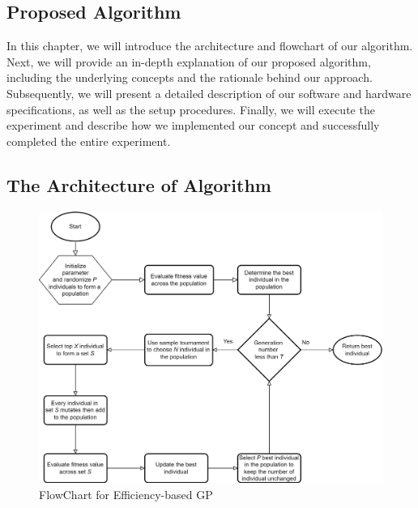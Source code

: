 \begin{ZhChapter}

\chapter{Proposed Algorithm}
In this chapter, we will introduce the architecture and flowchart of our algorithm. Next, we will provide an in-depth explanation of our proposed algorithm, including the underlying concepts and the rationale behind our approach. Subsequently, we will present a detailed description of our software and hardware specifications, as well as the setup procedures. Finally, we will execute the experiment and describe how we implemented our concept and successfully completed the entire experiment.
\section{The Architecture of Algorithm} %
\begin{figure}[htbp]
    \centering
    \includegraphics[width = 1\textwidth]{image/FlowChart.png}
    \caption{FlowChart for Efficiency-based GP}
    \label{fig: FlowChart}
\end{figure}



\end{ZhChapter}
